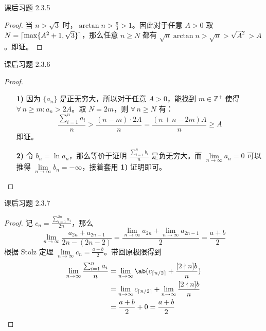 \begin{problem}
	课后习题 2.3.5

	\begin{proof}
		当 $n > \sqrt 3$ 时，$\arctan n > \frac{\pi}{3} > 1$。因此对于任意 $A > 0$ 取 $N = \lceil\max\{A^2 + 1, \sqrt 3\}\rceil$，那么任意 $n \ge N$ 都有 $\sqrt n \arctan n > \sqrt n > \sqrt{A^2} > A$。即证。 
	\end{proof}
\end{problem}

\begin{problem}
	课后习题 2.3.6

	\begin{proof}
		\begin{enumerate}
			\item[\textbf{1)}] 因为 $\{a_n\}$ 是正无穷大，所以对于任意 $A > 0$，能找到 $m \in \mathbb{Z}^+$ 使得 $\forall\,n \ge m: a_n > 2A$。取 $N = 2m$，则 $\forall\,n \ge N$ 有：
			$$
			\frac{\sum_{i=1}^n a_i}{n} > \frac{(n - m) \cdot 2A}{n} = \frac{(n + n - 2m)A}{n} \ge A
			$$
			即证。

			\item[\textbf{2)}] 令 $b_n = \ln a_n$，那么等价于证明 $\frac{\sum_{i=1}^n b_i}{n}$ 是负无穷大。而 $\lim\limits_{n \to \infty} a_n = 0$ 可以推得 $\lim\limits_{n \to \infty} b_n = -\infty$，接着套用 \textbf{1)} 证明即可。
		\end{enumerate}
	\end{proof}
\end{problem}

\begin{problem}
	课后习题 2.3.7

	\begin{proof}
		记 $c_n = \frac{\sum_{i=1}^{2n} a_i}{2n}$，那么
		$$
		\lim_{n \to \infty} \frac{a_{2n} + a_{2n - 1}}{2n - (2n - 2)} = \frac{\lim\limits_{n \to \infty} a_{2n} + \lim\limits_{n \to \infty} a_{2n - 1}}{2} = \frac{a + b}{2}
		$$
		根据 Stolz 定理 $\lim\limits_{n \to \infty} c_n = \frac{a + b}{2}$。带回原极限得到
		$$
		\begin{aligned}
			\lim_{n \to \infty} \frac{\sum_{i=1}^n a_i}{n} & = \lim_{n \to \infty} \ab(c_{\ceil{n/2}} + \frac{[2 \nmid n] b}{n}) \\
			& = \lim_{n \to \infty} c_{\ceil{n/2}} + \lim_{n \to \infty} \frac{[2 \nmid n] b}{n} \\
			& = \frac{a + b}{2} + 0 = \frac{a + b}{2}
		\end{aligned}
		$$
	\end{proof}
\end{problem}

